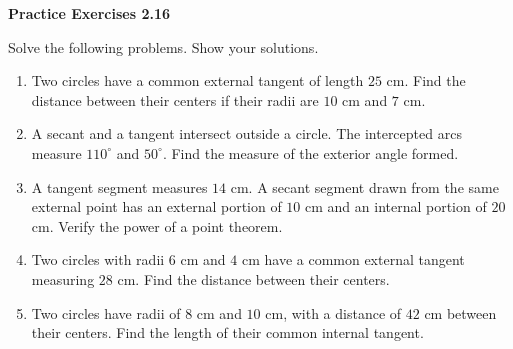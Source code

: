 \vspace{0.3ex}
\noindent\textbf{Practice Exercises 2.16}

\vspace{0.2ex}

Solve the following problems. Show your solutions.

\begin{enumerate}
    \item Two circles have a common external tangent of length $25$ cm. Find the distance between their centers if their radii are $10$ cm and $7$ cm.
    \item A secant and a tangent intersect outside a circle. The intercepted arcs measure $110^\circ$ and $50^\circ$. Find the measure of the exterior angle formed.
    \item A tangent segment measures $14$ cm. A secant segment drawn from the same external point has an external portion of $10$ cm and an internal portion of $20$ cm. Verify the power of a point theorem.
    \item Two circles with radii $6$ cm and $4$ cm have a common external tangent measuring $28$ cm. Find the distance between their centers.
    \item Two circles have radii of $8$ cm and $10$ cm, with a distance of $42$ cm between their centers. Find the length of their common internal tangent.
\end{enumerate}

